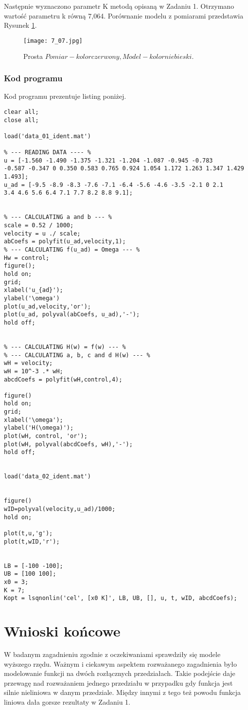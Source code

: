 \documentclass[a4paper,15pt]{article}
\begin{document}
Następnie wyznaczono parametr K metodą opisaną w Zadaniu 1. Otrzymano wartość parametru k równą 7,064. Porównanie modelu z pomiarami przedstawia Rysunek \ref{fig:7_07}.

\begin{figure}[H]
\centerline{\texttt{[image: 7\_07.jpg]}}
\centering
\caption{Prosta \( Pomiar - kolor czerwony, Model - kolor niebieski. \)}
\label{fig:7_07}
\end{figure}


\subsubsection{Kod programu}
Kod programu prezentuje listing poniżej.
\begin{lstlisting}[caption=Zadanie 2, captionpos=b,label=lis1, firstnumber=1,frame=single]
clear all;
close all;

load('data_01_ident.mat')

% --- READING DATA ---- % 
u = [-1.560 -1.490 -1.375 -1.321 -1.204 -1.087 -0.945 -0.783 
-0.587 -0.347 0 0.350 0.583 0.765 0.924 1.054 1.172 1.263 1.347 1.429 1.493];
u_ad = [-9.5 -8.9 -8.3 -7.6 -7.1 -6.4 -5.6 -4.6 -3.5 -2.1 0 2.1 
3.4 4.6 5.6 6.4 7.1 7.7 8.2 8.8 9.1];


% --- CALCULATING a and b --- %
scale = 0.52 / 1000;
velocity = u ./ scale;
abCoefs = polyfit(u_ad,velocity,1);
% --- CALCULATING f(u_ad) = Omega --- %
Hw = control;
figure();
hold on;
grid;
xlabel('u_{ad}');
ylabel('\omega')
plot(u_ad,velocity,'or');
plot(u_ad, polyval(abCoefs, u_ad),'-');
hold off;


% --- CALCULATING H(w) = f(w) --- %
% --- CALCULATING a, b, c and d H(w) --- %
wH = velocity;
wH = 10^-3 .* wH;
abcdCoefs = polyfit(wH,control,4);

figure()
hold on;
grid;
xlabel('\omega');
ylabel('H(\omega)');
plot(wH, control, 'or');
plot(wH, polyval(abcdCoefs, wH),'-');
hold off;


load('data_02_ident.mat')


figure()
wID=polyval(velocity,u_ad)/1000;
hold on;

plot(t,u,'g');
plot(t,wID,'r');


LB = [-100 -100]; 
UB = [100 100]; 
x0 = 3;
K = 7;
Kopt = lsqnonlin('cel', [x0 K]', LB, UB, [], u, t, wID, abcdCoefs);

\end{lstlisting}



\section{Wnioski końcowe}
W badanym zagadnieniu zgodnie z oczekiwaniami sprawdziły się modele wyższego rzędu.  Ważnym i ciekawym aspektem rozważanego zagadnienia było modelowanie funkcji na dwóch rozłącznych przedziałach. Takie podejście daje przewagę nad rozważaniem jednego przedziału w przypadku gdy funkcja jest silnie nieliniowa w danym przedziale. Między innymi z tego też powodu funkcja liniowa dała gorsze rezultaty w Zadaniu 1.

 
\end{document}
